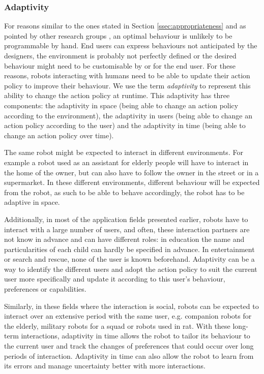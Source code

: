 \subsubsection{Adaptivity}	\label{ssec:adap}
    For reasons similar to the ones stated in Section \ref{ssec:appropriateness} and as pointed by other research groups \citep{argall2009survey, hoffman2016openwoz}, an optimal behaviour is unlikely to be programmable by hand. End users can express behaviours not anticipated by the designers, the environment is probably not perfectly defined or the desired behaviour might need to be customisable by or for the end user. For these reasons, robots interacting with humans need to be able to update their action policy to improve their behaviour. We use the term \emph{adaptivity} to represent this ability to change the action policy at runtime. This adaptivity has three components: the adaptivity in space (being able to change an action policy according to the environment), the adaptivity in users (being able to change an action policy according to the user) and the adaptivity in time (being able to change an action policy over time). 

    The same robot might be expected to interact in different environments. For example a robot used as an assistant for elderly people will have to interact in the home of the owner, but can also have to follow the owner in the street or in a supermarket. In these different environments, different behaviour will be expected from the robot, as such to be able to behave accordingly, the robot has to be adaptive in space.

    Additionally, in most of the application fields presented earlier, robots have to interact with a large number of users, and often, these interaction partners are not know in advance and can have different roles: in education the name and particularities of each child can hardly be specified in advance. In entertainment or search and rescue, none of the user is known beforehand. Adaptivity can be a way to identify the different users and adopt the action policy to suit the current user more specifically and update it according to this user's behaviour, preferences or capabilities.

    Similarly, in these fields where the interaction is social, robots can be expected to interact over an extensive period with the same user, e.g. companion robots for the elderly, military robots for a squad or robots used in \gls{rat}. With these long-term interactions, adaptivity in time allows the robot to tailor its behaviour to the current user and track the changes of preferences that could occur over long periods of interaction. Adaptivity in time can also allow the robot to learn from its errors and manage uncertainty better with more interactions.

